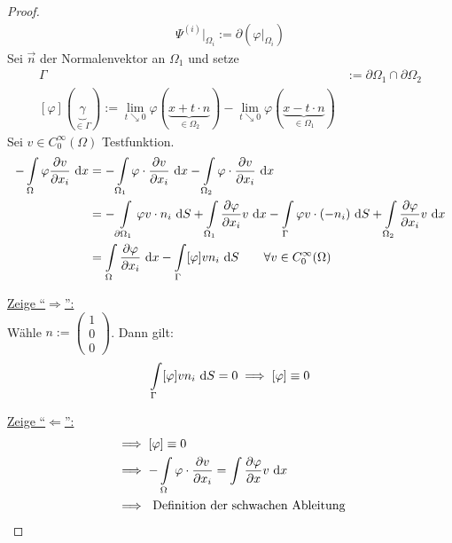 \begin{proof}
	\begin{align*}
		\Psi^{(i)}|_{\Omega_i}:=\partial\left(\varphi|_{\Omega_i}\right)
	\end{align*}
	Sei $\vec{n}$ der Normalenvektor an $\Omega_1$ und setze
	\begin{align*}
		\Gamma&:=\partial\Omega_1\cap\partial\Omega_2\\
		[\varphi](\underbrace{\gamma}_{\in\Gamma}):=\lim\limits_{t\searrow 0}\varphi(\underbrace{x+t\cdot n}_{\in\Omega_2})-\lim\limits_{t\searrow0}\varphi(\underbrace{x-t\cdot n}_{\in\Omega_1})
	\end{align*}
	Sei $v\in C_0^\infty(\Omega)$ Testfunktion.
	\begin{align*}
		-\int\limits_\Omega\varphi\frac{\partial v}{\partial x_i}\text{ d} x
		&=-\int\limits_{\Omega_1}\varphi\cdot\frac{\partial v}{\partial x_i}\text{ d} x
		-\int\limits_{\Omega_2}\varphi\cdot\frac{\partial v}{\partial x_i}\text{ d} x\\
		&=-\int\limits_{\partial\Omega_1}\varphi v\cdot n_i\text{ d} S+\int\limits_{\Omega_1}\frac{\partial\varphi}{\partial x_i}v\text{ d} x
		-\int\limits_{\Gamma}\varphi v\cdot(-n_i)\text{ d} S+\int\limits_{\Omega_2}\frac{\partial\varphi}{\partial x_i}v\text{ d} x\\
		&=\int\limits_\Omega\frac{\partial\varphi}{\partial x_i}\text{ d} x-\int\limits_\Gamma[\varphi] v n_i\text{ d} S\qquad\forall v\in C_0^\infty(\Omega)
	\end{align*}

	\underline{Zeige ``$\Rightarrow$'':}\\
	Wähle $n:=\begin{pmatrix}
		1\\ 
		0\\
		0
	\end{pmatrix}$. 
	Dann gilt:
	\begin{align*}
		\int\limits_\Gamma[\varphi] v n_i\text{ d} S=0\implies[\varphi]\equiv0
	\end{align*}

	\underline{Zeige ``$\Leftarrow$'':}
	\begin{align*}
		&\implies[\varphi]\equiv0\\
		&\implies -\int\limits_\Omega\varphi\cdot\frac{\partial v}{\partial x_i}
		=\int\limits \frac{\partial\varphi}{\partial x}v\text{ d} x\\
		&\implies\text{ Definition der schwachen Ableitung}
	\end{align*}
\end{proof}


